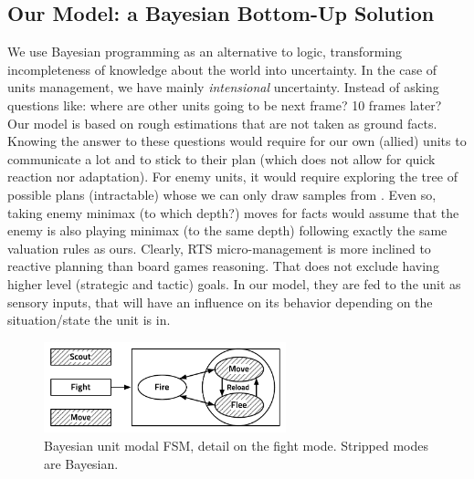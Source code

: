 \subsection{Our Model: a Bayesian Bottom-Up Solution}

We use Bayesian programming as an alternative to logic, transforming incompleteness of knowledge about the world into uncertainty. In the case of units management, we have mainly \textit{intensional} uncertainty. Instead of asking questions like: where are other units going to be next frame? 10 frames later? Our model is based on rough estimations that are not taken as ground facts. Knowing the answer to these questions would require for our own (allied) units to communicate a lot and to stick to their plan (which does not allow for quick reaction nor adaptation). For enemy units, it would require exploring the tree of possible plans (intractable) whose we can only draw samples from \citep{UCT}. Even so, taking enemy minimax (to which depth?) moves for facts would assume that the enemy is also playing minimax (to the same depth) following exactly the same valuation rules as ours. Clearly, RTS micro-management is more inclined to reactive planning than board games reasoning. That does not exclude having higher level (strategic and tactic) goals. In our model, they are fed to the unit as sensory inputs, that will have an influence on its behavior depending on the situation/state the unit is in.

\begin{figure}[!ht]
\begin{center}
\includegraphics[width=7cm]{images/unit_HFSM.pdf}
\end{center}
\label{fig:HFSM}
\caption{Bayesian unit modal FSM, detail on the fight mode. Stripped modes are Bayesian.}
\end{figure}

